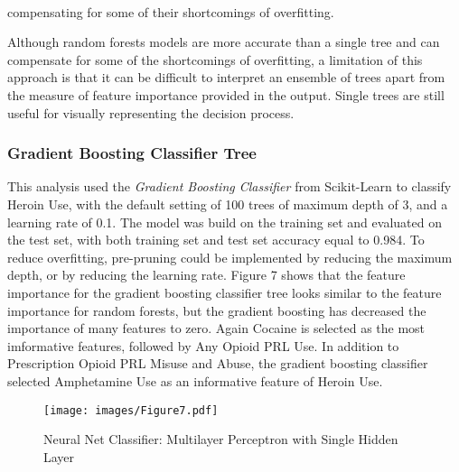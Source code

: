 \\\documentclass[sigconf]{acmart}
\begin{document}
compensating for some of their shortcomings of overfitting.

Although random forests models are more accurate than a single tree and can
compensate for some of the shortcomings of overfitting, a limitation of this 
approach is that it can be difficult to interpret an ensemble of trees apart 
from the measure of feature importance provided in the output. Single trees 
are still useful for visually representing the decision process.

\subsubsection{Gradient Boosting Classifier Tree}


This analysis used the 
\emph{Gradient Boosting Classifier} from Scikit-Learn to classify Heroin Use, 
with the default setting of 100 trees of maximum depth of 3, and a learning 
rate of 0.1. The model was build on the training set and evaluated on the test 
set, with both training set and test set accuracy equal to 0.984. To reduce
overfitting, pre-pruning could be implemented by reducing the maximum depth, 
or by reducing the learning rate. Figure 7 shows that the feature importance 
for the gradient boosting classifier tree looks similar to the feature 
importance for random forests, but the gradient boosting has decreased the 
importance of many features to zero. Again Cocaine is selected as the most 
imformative features, followed by Any Opioid PRL Use. In addition to 
Prescription Opioid PRL Misuse and Abuse, the gradient boosting classifier 
selected Amphetamine Use as an informative feature of Heroin Use. 

\begin{figure}[!ht]
  \centering\texttt{[image: images/Figure7.pdf]}
  \caption{Neural Net Classifier: Multilayer Perceptron with Single Hidden Layer}
  \label{f:Figur7}
\end{figure}
\end{document}
